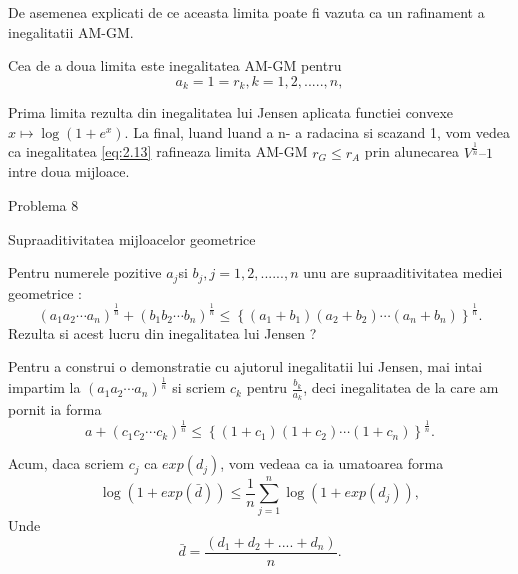 \documentclass[a4paper,12pt,oneside]{report}
\begin{document}
De asemenea explicati de ce aceasta limita poate fi vazuta ca un rafinament a inegalitatii AM-GM. 

Cea de a doua limita este inegalitatea AM-GM pentru
\begin{displaymath}
  a_{k} = 1 = r_{k}, k =1,2,.....,n,
\end{displaymath} 

Prima limita rezulta din inegalitatea lui Jensen aplicata functiei convexe \(x \mapsto \log\left ( 1 + e^{x} \right ).\) 
La final, luand luand a n- a radacina si scazand 1, vom vedea ca inegalitatea \ref{eq:2.13} rafineaza limita AM-GM  \(r_{G} \leq r_{A}\) prin alunecarea \(V^{\frac{1}{n}} – 1\) intre doua mijloace. 


Problema 8

Supraaditivitatea mijloacelor geometrice
	
Pentru numerele pozitive \(a_{j} \)si \(b_{j}, j = 1 , 2, ......,n\) unu are supraaditivitatea mediei geometrice :
\begin{displaymath}
  \left ( a_{1}a_{2}\cdots a_{n} \right )^{\frac{1}{n}} + \left ( b_{1}b_{2}\cdots b_{n} \right )^{\frac{1}{n}} \leq  \left \{ \left ( a_{1} + b_{1}\right ) \left ( a_{2} + b_{2} \right )\cdots \left ( a_{n} + b_{n} \right )\right \}^{\frac{1}{n}}. 
\end{displaymath}
	Rezulta si acest lucru din inegalitatea lui Jensen ?
	
	Pentru a construi o demonstratie cu ajutorul inegalitatii lui Jensen, mai intai impartim la 
\(\left ( a_{1}a_{2}\cdots a_{n} \right )^{\frac{1}{n}}\) si scriem \(c_{k}\) pentru \(\frac{b_{k}}{a_{k}}\), deci inegalitatea de la care am pornit ia forma 
\begin{displaymath}
  a + \left ( c_{1}c_{2} \cdots c_{k}\right )^{\frac{1}{n}}\leq \left \{ \left ( 1 + c_{1} \right )\left ( 1 + c_{2} \right )\cdots \left ( 1 + c_{n} \right ) \right \}^{\frac{1}{n}}. 
\end{displaymath}

Acum, daca scriem \(c_{j}\) ca \(exp\left (d _{j} \right )\), vom vedeaa ca ia umatoarea forma 
\begin{displaymath}
  \log\left ( 1 + exp\left ( \bar{d} \right ) \right ) \leq \frac{1}{n}\sum_{j = 1}^{n}\log\left ( 1 + exp\left ( d_{j} \right ) \right ),
\end{displaymath}
Unde 
\begin{displaymath}
  \bar{d} = \frac{\left ( d_{1} + d_{2}  + ....+ d_{n}\right )}{n}.
\end{displaymath} 
\end{document}
